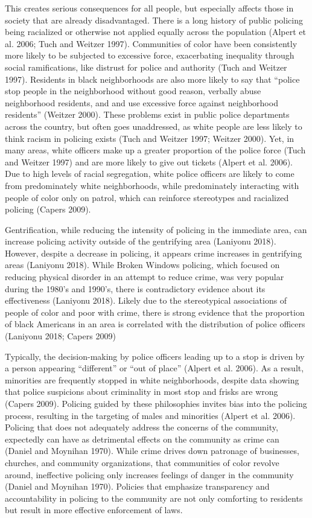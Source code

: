 \documentclass{ucetd}
\begin{document}
This creates serious consequences for all people, but especially affects
those in society that are already disadvantaged. There is a long history
of public policing being racialized or otherwise not applied equally
across the population (Alpert et al. 2006; Tuch and Weitzer 1997).
Communities of color have been consistently more likely to be subjected
to excessive force, exacerbating inequality through social
ramifications, like distrust for police and authority (Tuch and Weitzer
1997). Residents in black neighborhoods are also more likely to say that
``police stop people in the neighborhood without good reason, verbally
abuse neighborhood residents, and and use excessive force against
neighborhood residents'' (Weitzer 2000). These problems exist in public
police departments across the country, but often goes unaddressed, as
white people are less likely to think racism in policing exists (Tuch
and Weitzer 1997; Weitzer 2000). Yet, in many areas, white officers make
up a greater proportion of the police force (Tuch and Weitzer 1997) and
are more likely to give out tickets (Alpert et al. 2006). Due to high
levels of racial segregation, white police officers are likely to come
from predominately white neighborhoods, while predominately interacting
with people of color only on patrol, which can reinforce stereotypes and
racialized policing (Capers 2009).

Gentrification, while reducing the intensity of policing in the
immediate area, can increase policing activity outside of the
gentrifying area (Laniyonu 2018). However, despite a decrease in
policing, it appears crime increases in gentrifying areas (Laniyonu
2018). While Broken Windows policing, which focused on reducing physical
disorder in an attempt to reduce crime, was very popular during the
1980's and 1990's, there is contradictory evidence about its
effectiveness (Laniyonu 2018). Likely due to the stereotypical
associations of people of color and poor with crime, there is strong
evidence that the proportion of black Americans in an area is correlated
with the distribution of police officers (Laniyonu 2018; Capers 2009)

Typically, the decision-making by police officers leading up to a stop
is driven by a person appearing ``different'' or ``out of place''
(Alpert et al. 2006). As a result, minorities are frequently stopped in
white neighborhoods, despite data showing that police suspicions about
criminality in most stop and frisks are wrong (Capers 2009). Policing
guided by these philosophies invites bias into the policing process,
resulting in the targeting of males and minorities (Alpert et al. 2006).
Policing that does not adequately address the concerns of the community,
expectedly can have as detrimental effects on the community as crime can
(Daniel and Moynihan 1970). While crime drives down patronage of
businesses, churches, and community organizations, that communities of
color revolve around, ineffective policing only increases feelings of
danger in the community (Daniel and Moynihan 1970). Policies that
emphasize transparency and accountability in policing to the community
are not only comforting to residents but result in more effective
enforcement of laws.
\end{document}
